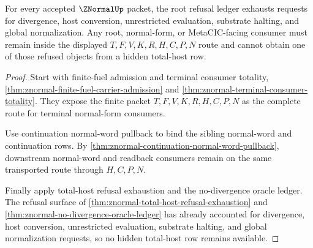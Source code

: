 \begin{theorem}
\label{thm:znormal-root-refusal-audit-exhaustion}
For every accepted $\ZNormalUp$ packet, the root refusal ledger exhausts requests for divergence, host conversion, unrestricted evaluation, substrate halting, and global normalization. Any root, normal-form, or MetaCIC-facing consumer must remain inside the displayed $T,F,V,K,R,H,C,P,N$ route and cannot obtain one of those refused objects from a hidden total-host row.
\end{theorem}
\begin{proof}
Start with finite-fuel admission and terminal consumer totality, \autoref{thm:znormal-finite-fuel-carrier-admission} and \autoref{thm:znormal-terminal-consumer-totality}. They expose the finite packet $T,F,V,K,R,H,C,P,N$ as the complete route for terminal normal-form consumers.

Use continuation normal-word pullback to bind the sibling normal-word and continuation rows. By \autoref{thm:znormal-continuation-normal-word-pullback}, downstream normal-word and readback consumers remain on the same transported route through $H,C,P,N$.

Finally apply total-host refusal exhaustion and the no-divergence oracle ledger. The refusal surface of \autoref{thm:znormal-total-host-refusal-exhaustion} and \autoref{thm:znormal-no-divergence-oracle-ledger} has already accounted for divergence, host conversion, unrestricted evaluation, substrate halting, and global normalization requests, so no hidden total-host row remains available.
\end{proof}
